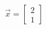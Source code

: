 \documentclass[preview]{standalone}
\begin{document}
\begin{align*}
\vec{x} = \begin{bmatrix} 2 \\ 1 \end{bmatrix}
\end{align*}
\end{document}
